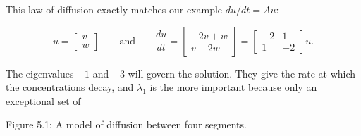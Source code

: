 This law of diffusion exactly matches our example \(du/dt=Au\):

\[u=\begin{bmatrix}v\\ w\end{bmatrix}\qquad\text{and}\qquad\frac{du}{dt}=\begin{bmatrix}-2v+w\\ v-2w\end{bmatrix}=\begin{bmatrix}-2&1\\ 1&-2\end{bmatrix}u.\]

The eigenvalues \(-1\) and \(-3\) will govern the solution. They give the rate at which the concentrations decay, and \(\lambda_{1}\) is the more important because only an exceptional set of

Figure 5.1: A model of diffusion between four segments.

 